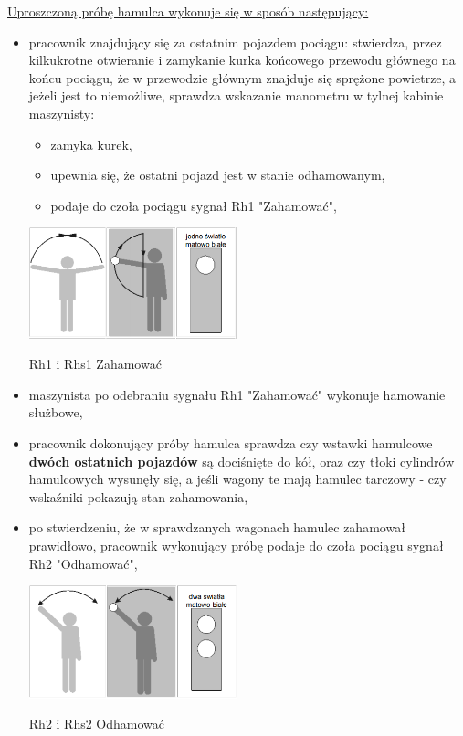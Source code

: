 \underline{Uproszczoną próbę hamulca wykonuje się w sposób następujący:} 
\begin{itemize}
	\item pracownik znajdujący się za ostatnim pojazdem pociągu: stwierdza, przez kilkukrotne otwieranie i zamykanie kurka końcowego przewodu głównego na końcu pociągu, że w przewodzie głównym znajduje się sprężone powietrze, a jeżeli jest to niemożliwe, sprawdza wskazanie manometru w tylnej kabinie maszynisty: 
	\begin{itemize}
		\item zamyka kurek, 
		\item upewnia się, że ostatni pojazd jest w stanie odhamowanym, 
		\item podaje do czoła pociągu sygnał Rh1 "Zahamować", 
	\end{itemize}
\begin{marginfigure}
	\includegraphics[width=6cm]{skryptkierownik-img/skryptkierownik-img069.png}
	\caption{Rh1 i Rhs1 Zahamować}
\end{marginfigure}
	\item maszynista po odebraniu sygnału Rh1 "Zahamować" wykonuje hamowanie służbowe, 
	\item pracownik dokonujący próby hamulca sprawdza czy wstawki hamulcowe \textbf{dwóch ostatnich pojazdów} są dociśnięte do kół, oraz czy tłoki cylindrów hamulcowych wysunęły się, a jeśli wagony te mają hamulec tarczowy - czy wskaźniki pokazują stan zahamowania, 
	\item po stwierdzeniu, że w sprawdzanych wagonach hamulec zahamował prawidłowo, pracownik wykonujący próbę podaje do czoła pociągu sygnał Rh2 "Odhamować",
\begin{marginfigure}
	\includegraphics[width=6cm]{skryptkierownik-img/skryptkierownik-img067.png}
	\caption{Rh2 i Rhs2 Odhamować}
\end{marginfigure}


\end{itemize}
